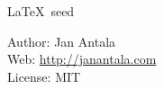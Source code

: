 \setlength{\parindent}{0cm}
\thispagestyle{empty}

\vspace*{\fill}

\begin{center}

  \begin{LARGE}
    \textmd{\LaTeX\ seed}
  \end{LARGE}

\end{center}

\vspace*{\fill}

\begin{flushleft}
\large{Author: Jan Antala} \\
\large{Web: \url{http://janantala.com}} \\
\large{License: MIT} \\
\end{flushleft}